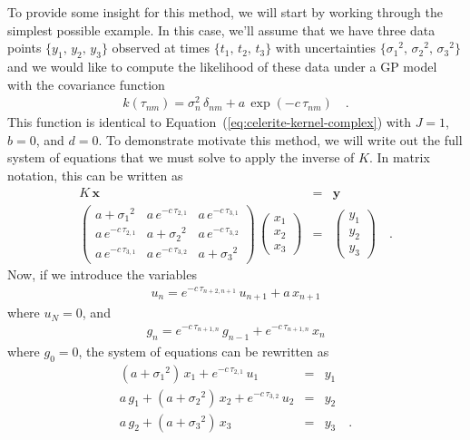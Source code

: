 \documentclass[manuscript, letterpaper]{aastex6}
\renewcommand{\eqref}[1]{\ref{eq:#1}}
\newcommand{\Eq}[1]{Equation~(\eqref{#1})}
\newcommand{\eq}[1]{\Eq{#1}}
\newcommand{\eqlabel}[1]{\label{eq:#1}}
\newcommand{\bvec}[1]{{\ensuremath{\boldsymbol{#1}}}}
\begin{document}
To provide some insight for this method, we will start by working through the
simplest possible example.
In this case, we'll assume that we have three data points
$\{y_1,\,y_2,\,y_3\}$ observed at times $\{t_1,\,t_2,\,t_3\}$ with
uncertainties $\{{\sigma_1}^2,\,{\sigma_2}^2,\,{\sigma_3}^2\}$ and we would
like to compute the likelihood of these data under a GP model with the
covariance function
\begin{eqnarray}
k(\tau_{nm}) = \sigma_n^2\,\delta_{nm} + a\,\exp(-c\,\tau_{nm})\quad.
\end{eqnarray}
This function is identical to \eq{celerite-kernel-complex} with $J=1$, $b=0$,
and $d=0$.
To demonstrate motivate this method, we will write out the full system of
equations that we must solve to apply the inverse of $K$.
In matrix notation, this can be written as
\begin{eqnarray}\eqlabel{impl-matrix}
K\,\bvec{x} &=& \bvec{y} \\
\begin{pmatrix}
    a+{\sigma_1}^2 & a\,e^{-c\,\tau_{2,1}} & a\,e^{-c\,\tau_{3,1}}\\
    a\,e^{-c\,\tau_{2,1}} & a+{\sigma_2}^2 & a\,e^{-c\,\tau_{3,2}}\\
    a\,e^{-c\,\tau_{3,1}} & a\,e^{-c\,\tau_{3,2}} & a+{\sigma_3}^2
\end{pmatrix}\,
\begin{pmatrix}
    x_1 \\ x_2 \\ x_3
\end{pmatrix} &=&
\begin{pmatrix}
    y_1 \\ y_2 \\ y_3
\end{pmatrix} \quad.
\end{eqnarray}
Now, if we introduce the variables
\begin{eqnarray}
    u_n = e^{-c\,\tau_{n+2,n+1}}\,u_{n+1} + a\,x_{n+1}
\end{eqnarray}
where $u_{N} = 0$, and
\begin{eqnarray}\eqlabel{algo-first}
    g_n = e^{-c\,\tau_{n+1,n}}\,g_{n-1} + e^{-c\,\tau_{n+1,n}}\,x_{n}
\end{eqnarray}
where $g_{0} = 0$,
the system of equations can be rewritten as
\begin{eqnarray}
(a+{\sigma_1}^2)\,x_1 + e^{-c\,\tau_{2,1}}\,u_1 &=& y_1 \\
a\,g_1 + (a+{\sigma_2}^2)\,x_2 + e^{-c\,\tau_{3,2}}\,u_2 &=& y_2 \\
a\,g_2 + (a+{\sigma_3}^2)\,x_3 &=& y_3 \quad. \eqlabel{algo-last}
\end{eqnarray}
\end{document}
